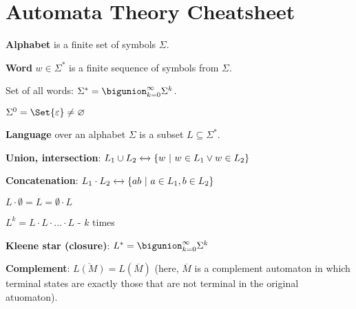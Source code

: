 \documentclass[a4paper,10pt]{article}
\begin{document}

\setcounter{section}{5}%
\section{Automata Theory Cheatsheet}

\begin{terms}
    \item \textbf{Alphabet} is a finite set of symbols $\Sigma$.

    \begin{terms}
        \item \textbf{Word} $w \in \Sigma^*$ is a finite sequence of symbols from $\Sigma$.

        \item Set of all words: $\Sigma^* = \bigunion_{k = 0}^{\infty} \Sigma^k$.

        \item $\Sigma^0 = \Set{\varepsilon} \neq \emptyset$
    \end{terms}

    \item \textbf{Language} over an alphabet $\Sigma$ is a subset $L \subseteq \Sigma^*$.

    \begin{terms}
        \item \textbf{Union, intersection}: $L_1 \cup L_2 \xleftrightarrow{} \{w\ |\ w \in L_1 \lor w \in L_2\}$

        \item \textbf{Concatenation}: $L_1 \cdot L_2 \xleftrightarrow{} \{ab\ |\ a \in L_1, b \in L_2\}$

        \begin{terms}
            \item $L \cdot \emptyset = L = \emptyset \cdot L$

            \item $L^k = L \cdot L \cdot ... \cdot L$ - $k$ times

            \item \textbf{Kleene star (closure)}: $L^* = \bigunion_{k = 0}^{\infty}\Sigma^k$
        \end{terms}

        \item \textbf{Complement}: $\overline{L(M)} = L(\overline{M})$ (here, $\overline{M}$ is a complement automaton in which terminal states are exactly those that are not terminal in the original atuomaton).


\end{terms}
\end{terms}
\end{document}
